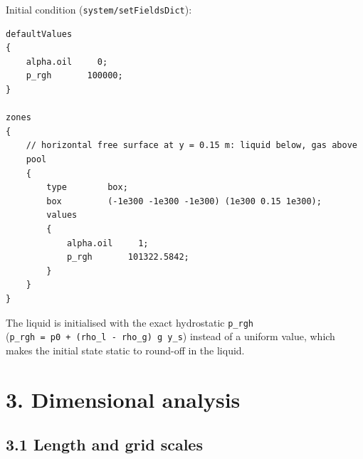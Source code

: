 \documentclass[11pt,english]{article}
\begin{document}
Initial condition (\texttt{system/setFieldsDict}):

\begin{verbatim}
defaultValues
{
    alpha.oil     0;
    p_rgh       100000;
}

zones
{
    // horizontal free surface at y = 0.15 m: liquid below, gas above
    pool
    {
        type        box;
        box         (-1e300 -1e300 -1e300) (1e300 0.15 1e300);
        values
        {
            alpha.oil     1;
            p_rgh       101322.5842;
        }
    }
}
\end{verbatim}

The liquid is initialised with the exact hydrostatic \texttt{p\_rgh}
(\texttt{p\_rgh\ =\ p0\ +\ (rho\_l\ -\ rho\_g)\ g\ y\_s}) instead of a
uniform value, which makes the initial state static to round-off in the
liquid.

\section{3. Dimensional analysis}\label{dimensional-analysis}

\subsection{3.1 Length and grid scales}\label{length-and-grid-scales}
\end{document}
